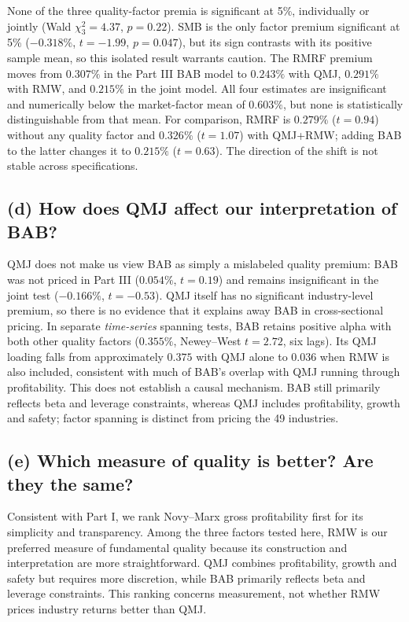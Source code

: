 \noindent None of the three quality-factor premia is significant at 5\%, individually
or jointly (Wald $\chi^2_3=4.37$, $p=0.22$). SMB is the only factor premium
significant at 5\% ($-0.318\%$, $t=-1.99$, $p=0.047$), but its sign
contrasts with its positive sample mean, so this isolated result warrants caution. The RMRF premium moves from $0.307\%$ in the
Part III BAB model to $0.243\%$ with QMJ, $0.291\%$ with RMW, and $0.215\%$
in the joint model. All four estimates are insignificant and numerically below
the market-factor mean of $0.603\%$, but none is statistically distinguishable
from that mean. For comparison, RMRF is $0.279\%$ ($t=0.94$) without any
quality factor and $0.326\%$ ($t=1.07$) with QMJ+RMW; adding BAB to the
latter changes it to $0.215\%$ ($t=0.63$). The direction of the shift is
not stable across specifications.

\subsection*{(d) How does QMJ affect our interpretation of BAB?}
QMJ does not make us view BAB as simply a mislabeled quality premium: BAB was
not priced in Part III ($0.054\%$, $t=0.19$) and remains insignificant in the
joint test ($-0.166\%$, $t=-0.53$). QMJ itself has no significant
industry-level premium, so there is no evidence that it explains away BAB in
cross-sectional pricing. In separate \emph{time-series} spanning tests, BAB
retains positive alpha with both other quality factors ($0.355\%$,
Newey--West $t=2.72$, six lags). Its QMJ loading falls from approximately
$0.375$ with QMJ alone to $0.036$ when RMW is also included, consistent with
much of BAB's overlap with QMJ running through profitability. This does not
establish a causal mechanism. BAB still primarily reflects beta and leverage
constraints, whereas QMJ includes profitability, growth and safety; factor
spanning is distinct from pricing the 49 industries.

\subsection*{(e) Which measure of quality is better? Are they the same?}
Consistent with Part I, we rank Novy--Marx gross profitability first for
its simplicity and transparency. Among the three factors tested here, RMW
is our preferred measure of fundamental quality because its construction
and interpretation are more straightforward. QMJ combines profitability,
growth and safety but requires more discretion, while BAB primarily reflects
beta and leverage constraints. This ranking concerns measurement, not
whether RMW prices industry returns better than QMJ.

